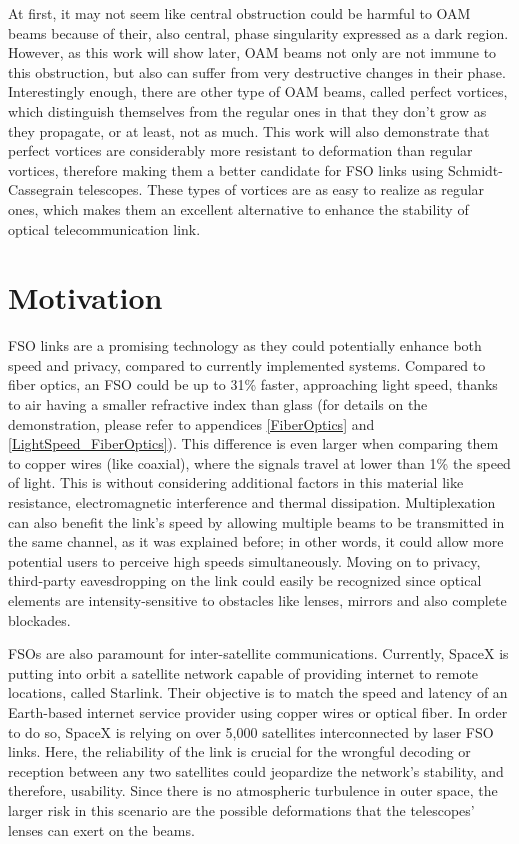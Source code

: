 At first, it may not seem like central obstruction could be harmful to OAM beams because of their, also central, phase singularity expressed as a dark region. However, as this work will show later, OAM beams not only are not immune to this obstruction, but also can suffer from very destructive changes in their phase. Interestingly enough, there are other type of OAM beams, called perfect vortices, which distinguish themselves from the regular ones in that they don't grow as they propagate, or at least, not as much. This work will also demonstrate that perfect vortices are considerably more resistant to deformation than regular vortices, therefore making them a better candidate for FSO links using Schmidt-Cassegrain telescopes. These types of vortices are as easy to realize as regular ones, which makes them an excellent alternative to enhance the stability of optical telecommunication link.

\section{Motivation}
\label{c1:Motivation}

FSO links are a promising technology as they could potentially enhance both speed and privacy, compared to currently implemented systems. Compared to fiber optics, an FSO could be up to 31\% faster, approaching light speed, thanks to air having a smaller refractive index than glass (for details on the demonstration, please refer to appendices \ref{FiberOptics} and \ref{LightSpeed_FiberOptics}). This difference is even larger when comparing them to copper wires (like coaxial), where the signals travel at lower than 1\% the speed of light. This is without considering additional factors in this material like resistance, electromagnetic interference and thermal dissipation. Multiplexation can also benefit the link's speed by allowing multiple beams to be transmitted in the same channel, as it was explained before; in other words, it could allow more potential users to perceive high speeds simultaneously. Moving on to privacy, third-party eavesdropping on the link could easily be recognized since optical elements are intensity-sensitive to obstacles like lenses, mirrors and also complete blockades.

FSOs are also paramount for inter-satellite communications. Currently, SpaceX is putting into orbit a satellite network capable of providing internet to remote locations, called Starlink. Their objective is to match the speed and latency of an Earth-based internet service provider using copper wires or optical fiber. In order to do so, SpaceX is relying on over 5,000 satellites interconnected by laser FSO links. Here, the reliability of the link is crucial for the wrongful decoding or reception between any two satellites could jeopardize the network's stability, and therefore, usability. Since there is no atmospheric turbulence in outer space, the larger risk in this scenario are the possible deformations that the telescopes' lenses can exert on the beams.

